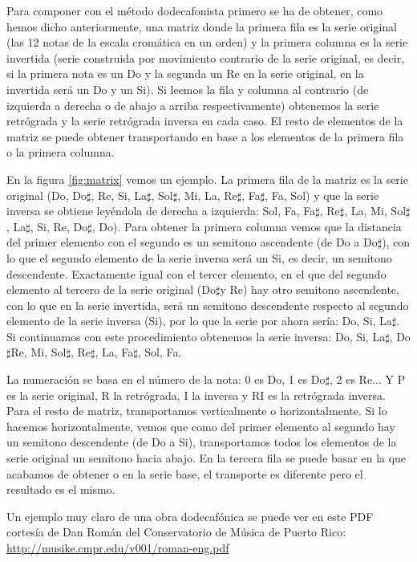 \documentclass[a4paper,openany,oneside,12pt]{book}
\newcommand{\textsharp}{$\sharp$}
\begin{document}
Para componer con el método dodecafonista primero se ha de obtener, como hemos dicho anteriormente, una matriz donde la primera fila es la serie original (las 12 notas de la escala cromática en un orden) y la primera columna es la serie invertida (serie construida por movimiento contrario de la serie original, es decir, si la primera nota es un Do y la segunda un Re en la serie original, en la invertida será un Do y un Si). Si leemos la fila y columna al contrario (de izquierda a derecha o de abajo a arriba respectivamente) obtenemos la serie retrógrada y la serie retrógrada inversa en cada caso. El resto de elementos de la matriz se puede obtener transportando en base a los elementos de la primera fila o la primera columna.

En la figura \ref{fig:matrix} vemos un ejemplo. La primera fila de la matriz es la serie original (Do, Do\textsharp, Re, Si, La\textsharp, Sol\textsharp, Mi, La, Re\textsharp, Fa\textsharp, Fa, Sol) y que la serie inversa se obtiene leyéndola de derecha a izquierda: Sol, Fa, Fa\textsharp, Re\textsharp, La, Mi, Sol\textsharp, La\textsharp, Si, Re, Do\textsharp, Do). Para obtener la primera columna vemos que la distancia del primer elemento con el segundo es un semitono ascendente (de Do a Do\textsharp), con lo que el segundo elemento de la serie inversa será un Si, es decir, un semitono descendente. Exactamente igual con el tercer elemento, en el que del segundo elemento al tercero de la serie original (Do\textsharp y Re) hay otro semitono ascendente, con lo que en la serie invertida, será un semitono descendente respecto al segundo elemento de la serie inversa (Si), por lo que la serie por ahora sería: Do, Si, La\textsharp. Si continuamos con este procedimiento obtenemos la serie inversa: Do, Si, La\textsharp, Do\textsharp Re, Mi, Sol\textsharp, Re\textsharp, La, Fa\textsharp, Sol, Fa. 

La numeración se basa en el número de la nota: 0 es Do, 1 es Do\textsharp, 2 es Re... Y P es la serie original, R la retrógrada, I la inversa y RI es la retrógrada inversa. Para el resto de matriz, transportamos verticalmente o horizontalmente. Si lo hacemos horizontalmente, vemos que como del primer elemento al segundo hay un semitono descendente (de Do a Si), transportamos todos los elementos de la serie original un semitono hacia abajo. En la tercera fila se puede basar en la que acabamos de obtener o en la serie base, el transporte es diferente pero el resultado es el mismo.

Un ejemplo muy claro de una obra dodecafónica se puede ver en este PDF cortesía de Dan Román del Conservatorio de Música de Puerto Rico: \url{http://musike.cmpr.edu/v001/roman-eng.pdf}
\end{document}
